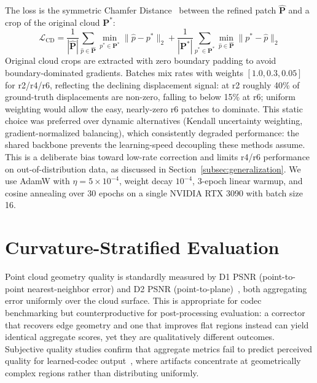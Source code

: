 \documentclass[conference]{IEEEtran}
\begin{document}
The loss is the symmetric Chamfer Distance~\cite{fan2017pointset} between the refined patch
$\hat{\mathbf{P}}$ and a crop of the original cloud $\mathbf{P}^*$:
\begin{equation}
  \mathcal{L}_{\mathrm{CD}} = \frac{1}{|\hat{\mathbf{P}}|}\sum_{\hat{p} \in
  \hat{\mathbf{P}}} \min_{p^* \in \mathbf{P}^*} \|\hat{p} - p^*\|_2
  + \frac{1}{|\mathbf{P}^*|}\sum_{p^* \in \mathbf{P}^*}
  \min_{\hat{p} \in \hat{\mathbf{P}}} \|p^* - \hat{p}\|_2
  \label{eq:cd}
\end{equation}
Original cloud crops are extracted with zero boundary padding to avoid
boundary-dominated gradients. Batches mix rates with weights $[1.0, 0.3, 0.05]$
for r2/r4/r6, reflecting the declining displacement signal: at r2 roughly
40\% of ground-truth displacements are non-zero, falling to below 15\% at r6;
uniform weighting would allow the easy, nearly-zero r6 patches to dominate.
This static choice was preferred over dynamic alternatives (Kendall
uncertainty weighting, gradient-normalized balancing), which consistently
degraded performance: the shared backbone prevents the learning-speed
decoupling these methods assume.
This is a deliberate bias toward low-rate correction and limits r4/r6
performance on out-of-distribution data, as discussed in
Section~\ref{subsec:generalization}.
We use AdamW with $\eta{=}5{\times}10^{-4}$, weight decay $10^{-4}$,
3-epoch linear warmup, and cosine annealing over 30 epochs on a single
NVIDIA RTX 3090 with batch size 16.

\section{Curvature-Stratified Evaluation}
\label{sec:metric}

Point cloud geometry quality is standardly measured by D1 PSNR
(point-to-point nearest-neighbor error) and D2 PSNR
(point-to-plane)~\cite{graziosi2020gpcc}, both aggregating error uniformly
over the cloud surface. This is appropriate for codec benchmarking but
counterproductive for post-processing evaluation: a corrector that recovers
edge geometry and one that improves flat regions instead can yield identical
aggregate scores, yet they are qualitatively different outcomes. Subjective
quality studies confirm that aggregate metrics fail to predict perceived
quality for learned-codec output~\cite{ak2024basics,prazeres2024quality},
where artifacts concentrate at geometrically complex regions rather than
distributing uniformly.
\end{document}
